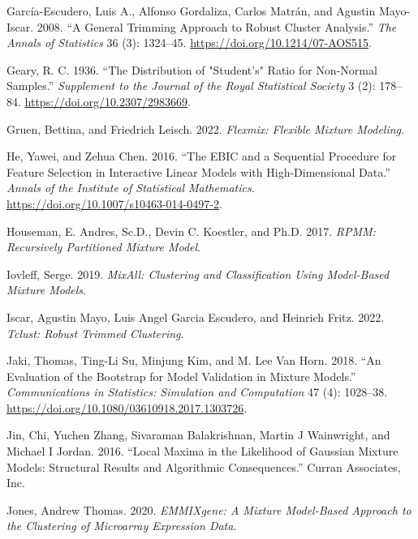\begin{CSLReferences}{1}{0}
\leavevmode{}%
García-Escudero, Luis A., Alfonso Gordaliza, Carlos Matrán, and Agustin Mayo-Iscar. 2008. {``A General Trimming Approach to Robust Cluster Analysis.''} \emph{The Annals of Statistics} 36 (3): 1324--45. \url{https://doi.org/10.1214/07-AOS515}.

\leavevmode{}%
Geary, R. C. 1936. {``The {Distribution} of "{Student}'s" {Ratio} for {Non-Normal Samples}.''} \emph{Supplement to the Journal of the Royal Statistical Society} 3 (2): 178--84. \url{https://doi.org/10.2307/2983669}.

\leavevmode{}%
Gruen, Bettina, and Friedrich Leisch. 2022. \emph{Flexmix: Flexible Mixture Modeling}.

\leavevmode{}%
He, Yawei, and Zehua Chen. 2016. {``The {EBIC} and a Sequential Procedure for Feature Selection in Interactive Linear Models with High-Dimensional Data.''} \emph{Annals of the Institute of Statistical Mathematics}. \url{https://doi.org/10.1007/s10463-014-0497-2}.

\leavevmode{}%
Houseman, E. Andres, Sc.D., Devin C. Koestler, and Ph.D. 2017. \emph{RPMM: Recursively Partitioned Mixture Model}.

\leavevmode{}%
Iovleff, Serge. 2019. \emph{MixAll: Clustering and Classification Using Model-Based Mixture Models}.

\leavevmode{}%
Iscar, Agustin Mayo, Luis Angel Garcia Escudero, and Heinrich Fritz. 2022. \emph{Tclust: Robust Trimmed Clustering}.

\leavevmode{}%
Jaki, Thomas, Ting-Li Su, Minjung Kim, and M. Lee Van Horn. 2018. {``An Evaluation of the Bootstrap for Model Validation in Mixture Models.''} \emph{Communications in Statistics: Simulation and Computation} 47 (4): 1028--38. \url{https://doi.org/10.1080/03610918.2017.1303726}.

\leavevmode{}%
Jin, Chi, Yuchen Zhang, Sivaraman Balakrishnan, Martin J Wainwright, and Michael I Jordan. 2016. {``Local {Maxima} in the {Likelihood} of {Gaussian Mixture Models}: {Structural Results} and {Algorithmic Consequences}.''} {Curran Associates, Inc.}

\leavevmode{}%
Jones, Andrew Thomas. 2020. \emph{EMMIXgene: A Mixture Model-Based Approach to the Clustering of Microarray Expression Data}.


\end{CSLReferences}
